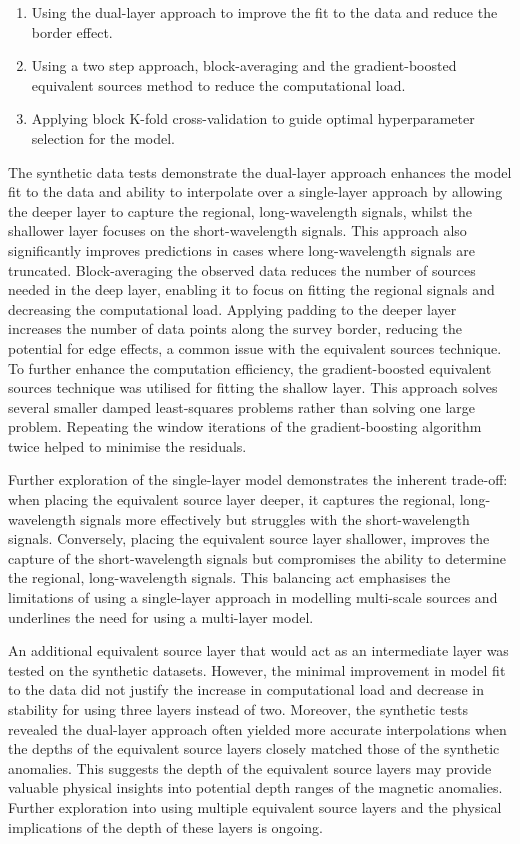 \begin{enumerate}
    \item Using the dual-layer approach to improve the fit to the data and reduce the border effect.
    \item Using a two step approach, block-averaging and the gradient-boosted equivalent sources method to reduce the computational load.
    \item Applying block K-fold cross-validation to guide optimal hyperparameter selection for the model.
\end{enumerate}

The synthetic data tests demonstrate the dual-layer approach enhances the model fit to the data and ability to interpolate over a single-layer approach by allowing the deeper layer to capture the regional, long-wavelength signals, whilst the shallower layer focuses on the short-wavelength signals. This approach also significantly improves predictions in cases where long-wavelength signals are truncated. Block-averaging the observed data reduces the number of sources needed in the deep layer, enabling it to focus on fitting the regional signals and decreasing the computational load. Applying padding to the deeper layer increases the number of data points along the survey border, reducing the potential for edge effects, a common issue with the equivalent sources technique. To further enhance the computation efficiency, the gradient-boosted equivalent sources technique was utilised for fitting the shallow layer. This approach solves several smaller damped least-squares problems rather than solving one large problem. Repeating the window iterations of the gradient-boosting algorithm twice helped to minimise the residuals.

Further exploration of the single-layer model demonstrates the inherent trade-off: when placing the equivalent source layer deeper, it captures the regional, long-wavelength signals more effectively but struggles with the short-wavelength signals. Conversely, placing the equivalent source layer shallower, improves the capture of the short-wavelength signals but compromises the ability to determine the regional, long-wavelength signals. This balancing act emphasises the limitations of using a single-layer approach in modelling multi-scale sources and underlines the need for using a multi-layer model.

An additional equivalent source layer that would act as an intermediate layer was tested on the synthetic datasets. However, the minimal improvement in model fit to the data did not justify the increase in computational load and decrease in stability for using three layers instead of two. Moreover, the synthetic tests revealed the dual-layer approach often yielded more accurate interpolations when the depths of the equivalent source layers closely matched those of the synthetic anomalies. This suggests the depth of the equivalent source layers may provide valuable physical insights into potential depth ranges of the magnetic anomalies. Further exploration into using multiple equivalent source layers and the physical implications of the depth of these layers is ongoing.

